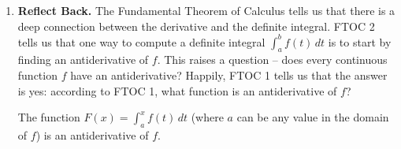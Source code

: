 \documentclass{article}
\begin{document}
\begin{enumerate}


\item  
  \begin{problem}
    \textbf{Reflect Back.}  The Fundamental Theorem of Calculus tells us
    that there is a deep connection between the derivative and the
    definite integral.  FTOC 2 tells us that one way to compute a definite
    integral $\displaystyle \int_a^b f(t)\,dt$ is to start by finding an
    antiderivative of $f$.  This raises a question -- does every
    continuous function $f$ have an antiderivative?  Happily, FTOC 1 tells
    us that the answer is yes: according to FTOC 1, what function is an
    antiderivative of $f$?
  \end{problem}
  \pspace{2in}

  \begin{solution}
    The function $F(x)=\int_a^x f(t)\,dt$ (where $a$ can be any value in the domain
    of $f$) is an antiderivative of $f$. 
  \end{solution}

\end{enumerate}

\end{document}
